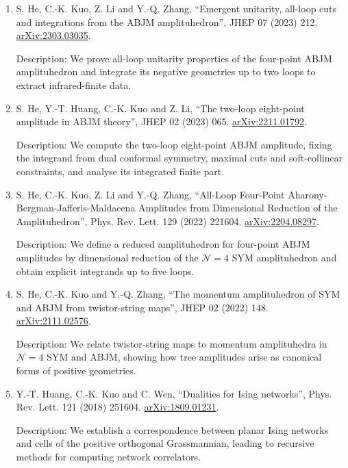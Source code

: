 \documentclass[10pt,a4paper]{article}
\newcommand{\publication}[4]{\item #1, ``#2'', #3. \href{https://arxiv.org/abs/#4}{arXiv:#4}.}
\newcommand{\pubdescription}[1]{{\small\color{muted}Description: #1}}
\begin{document}
\begin{enumerate}
  {\small\href{https://doi.org/10.1007/JHEP04(2024)064}{Erratum: JHEP 04 (2024) 064}.}

  \pubdescription{We develop a positive-geometric construction for planar ABJM loop integrands, obtaining explicit one-loop integrands through ten points and two-loop integrands through eight points.}

  \publication{S. He, C.-K. Kuo, Z. Li and Y.-Q. Zhang}{Emergent unitarity, all-loop cuts and integrations from the ABJM amplituhedron}{JHEP 07 (2023) 212}{2303.03035}

  \pubdescription{We prove all-loop unitarity properties of the four-point ABJM amplituhedron and integrate its negative geometries up to two loops to extract infrared-finite data.}

  \publication{S. He, Y.-T. Huang, C.-K. Kuo and Z. Li}{The two-loop eight-point amplitude in ABJM theory}{JHEP 02 (2023) 065}{2211.01792}

  \pubdescription{We compute the two-loop eight-point ABJM amplitude, fixing the integrand from dual conformal symmetry, maximal cuts and soft-collinear constraints, and analyse its integrated finite part.}

  \publication{S. He, C.-K. Kuo, Z. Li and Y.-Q. Zhang}{All-Loop Four-Point Aharony-Bergman-Jafferis-Maldacena Amplitudes from Dimensional Reduction of the Amplituhedron}{Phys. Rev. Lett. 129 (2022) 221604}{2204.08297}

  \pubdescription{We define a reduced amplituhedron for four-point ABJM amplitudes by dimensional reduction of the $\mathcal{N}=4$ SYM amplituhedron and obtain explicit integrands up to five loops.}

  \publication{S. He, C.-K. Kuo and Y.-Q. Zhang}{The momentum amplituhedron of SYM and ABJM from twistor-string maps}{JHEP 02 (2022) 148}{2111.02576}

  \pubdescription{We relate twistor-string maps to momentum amplituhedra in $\mathcal{N}=4$ SYM and ABJM, showing how tree amplitudes arise as canonical forms of positive geometries.}

  \publication{Y.-T. Huang, C.-K. Kuo and C. Wen}{Dualities for Ising networks}{Phys. Rev. Lett. 121 (2018) 251604}{1809.01231}

  \pubdescription{We establish a correspondence between planar Ising networks and cells of the positive orthogonal Grassmannian, leading to recursive methods for computing network correlators.}
\end{enumerate}
\end{document}

